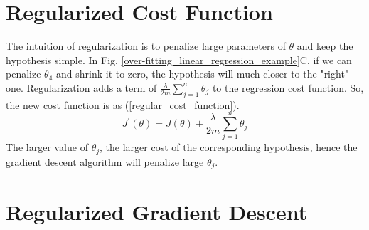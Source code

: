 \documentclass{article}
\begin{document}
\section{Regularized Cost Function}
The intuition of regularization is to penalize large parameters of $\theta$ and keep the hypothesis simple. In Fig. \ref{over-fitting_linear_regression_example}C, if we can penalize $\theta_{4}$ and shrink it to zero, the hypothesis will much closer to the "right" one. Regularization adds a term of $\frac{\lambda}{2m} \sum_{j=1}^{n}\theta_{j}$ to the regression cost function. So, the new cost function is as (\ref{regular_cost_function}).
\begin{equation}\label{regular_cost_function}
J^{'}(\theta) = J(\theta) + \frac{\lambda}{2m} \sum_{j=1}^{n}\theta_{j}
\end{equation}
The larger value of $\theta_{j}$, the larger cost of the corresponding hypothesis, hence the gradient descent algorithm will penalize large $\theta_{j}$.  

\section{Regularized Gradient Descent}
\end{document}

